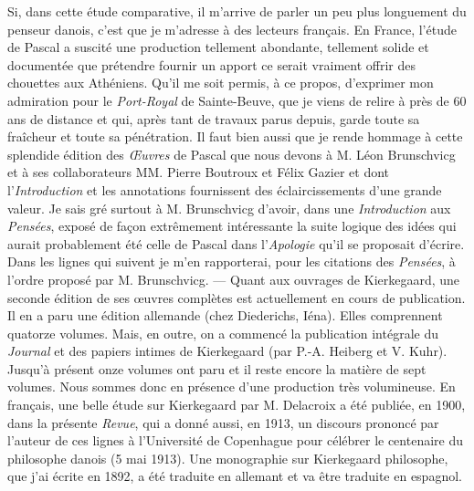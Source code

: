 \documentclass[12pt,a4paper]{article}
\newcommand{\opage}[1]{\marginnote{\footnotesize\textit{[#1]}}}
\begin{document}
Si, dans cette étude comparative, il m'arrive de parler un peu plus
longuement du penseur danois, c'est que je m'adresse à des lecteurs
français. En France, l'étude de Pascal a suscité une production tellement
abondante, tellement solide et documentée que prétendre
fournir un apport ce serait vraiment offrir des chouettes aux Athéniens.
Qu'il me soit permis, à ce propos, d'exprimer mon admiration
pour le \emph{Port-Royal} de Sainte-Beuve, que je viens de relire à
près de 60 ans de distance et qui, après tant de travaux parus depuis,
garde toute sa fraîcheur et toute sa pénétration. Il faut bien aussi
que je rende hommage à cette splendide édition des \emph{Œuvres} de Pascal
que nous devons à M. Léon Brunschvicg et à ses collaborateurs
MM. Pierre Boutroux et Félix Gazier et dont l'\emph{Introduction} et les
annotations fournissent des éclaircissements d'une grande valeur.
Je sais gré surtout à M. Brunschvicg d'avoir, dans une \emph{Introduction}
aux \emph{Pensées}, exposé de façon extrêmement intéressante la suite
logique des idées qui aurait probablement été celle de Pascal dans
l'\emph{Apologie} qu'il se proposait d'écrire. Dans les lignes qui suivent
\opage{224} je m'en rapporterai, pour les citations des \emph{Pensées}, à l'ordre proposé
par M. Brunschvicg. --- Quant aux ouvrages de Kierkegaard,
une seconde édition de ses œuvres complètes est actuellement en
cours de publication. Il en a paru une édition allemande (chez Diederichs,
Iéna). Elles comprennent quatorze volumes. Mais, en outre,
on a commencé la publication intégrale du \emph{Journal} et des papiers
intimes de Kierkegaard (par P.-A. Heiberg et V. Kuhr). Jusqu'à
présent onze volumes ont paru et il reste encore la matière de sept
volumes. Nous sommes donc en présence d'une production très volumineuse.
En français, une belle étude sur Kierkegaard par M. Delacroix
a été publiée, en 1900, dans la présente \emph{Revue}, qui a donné
aussi, en 1913, un discours prononcé par l'auteur de ces lignes à
l'Université de Copenhague pour célébrer le centenaire du philosophe
danois (5 mai 1913). Une monographie sur Kierkegaard
philosophe, que j'ai écrite en 1892, a été traduite en allemant et va
être traduite en espagnol.
\end{document}
